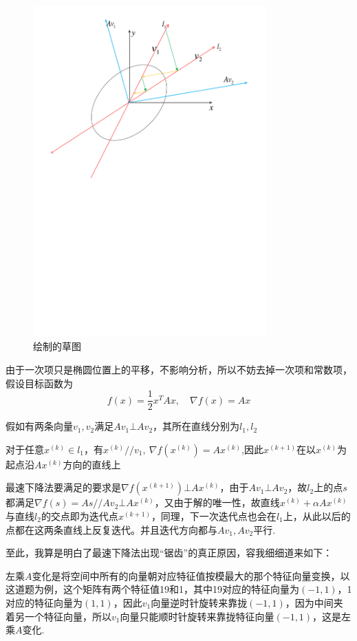 \begin{figure}[H]
\centering
\includegraphics[width=9cm]{fig/1_5.pdf}
\caption{绘制的草图}
\end{figure}

由于一次项只是椭圆位置上的平移，不影响分析，所以不妨去掉一次项和常数项，假设目标函数为
\[f(x)=\dfrac{1}{2}x^TAx,\quad \nabla f(x)=Ax\]

假如有两条向量$v_1,v_2$满足$Av_1\bot Av_2$，其所在直线分别为$l_1,l_2$

对于任意$x^{(k)}\in l_1$，有$x^{(k)}//v_1,\ \nabla f(x^{(k)})=Ax^{(k)}$,因此$x^{(k+1)}$在以$x^{(k)}$为起点沿$Ax^{(k)}$方向的直线上

最速下降法要满足的要求是$\nabla f(x^{(k+1)})\bot Ax^{(k)}$，由于$Av_1\bot Av_2$，故$l_2$上的点$s$都满足$\nabla f(s)=As//Av_2\bot Ax^{(k)}$，又由于解的唯一性，故直线$x^{(k)}+\alpha Ax^{(k)}$与直线$l_2$的交点即为迭代点$x^{(k+1)}$，同理，下一次迭代点也会在$l_1$上，从此以后的点都在这两条直线上反复迭代。并且迭代方向都与$Av_1,Av_2$平行.

至此，我算是明白了最速下降法出现“锯齿”的真正原因，容我细细道来如下：

左乘$A$变化是将空间中所有的向量朝对应特征值按模最大的那个特征向量变换，以这道题为例，这个矩阵有两个特征值19和1，其中19对应的特征向量为$(-1,1)$，1对应的特征向量为$(1,1)$，因此$v_1$向量逆时针旋转来靠拢$(-1,1)$，因为中间夹着另一个特征向量，所以$v_1$向量只能顺时针旋转来靠拢特征向量$(-1,1)$，这是左乘$A$变化.

